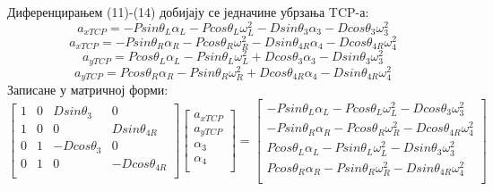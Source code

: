 \documentclass[12pt]{article}
\begin{document}
Диференцирањем (11)-(14) добијају се једначине убрзања TCP-а:
\begin{equation}
    a_{xTCP} = - Psin\theta_L\alpha_L - Pcos\theta_L\omega_L^2 - Dsin\theta_3\alpha_3 - Dcos\theta_3\omega_3^2
\end{equation}
\begin{equation}
    a_{xTCP} =  - Psin\theta_R\alpha_R - Pcos\theta_R\omega_R^2 - Dsin\theta_{4R}\alpha_4 - Dcos\theta_{4R}\omega_4^2
\end{equation}
\begin{equation}
    a_{yTCP} = Pcos\theta_L\alpha_L - Psin\theta_L\omega_L^2 + Dcos\theta_3\alpha_3 - Dsin\theta_3\omega_3^2 
\end{equation}
\begin{equation}
    a_{yTCP} = Pcos\theta_R\alpha_R - Psin\theta_R\omega_R^2 + Dcos\theta_{4R}\alpha_4 - Dsin\theta_{4R}\omega_4^2
\end{equation}
Записане у матричној форми:
\begin{equation}
\begin{bmatrix}
1 & 0 & Dsin\theta_3 & 0\\
1 & 0 & 0 & Dsin\theta_{4R}\\
0 & 1 & -Dcos\theta_3 & 0\\
0 & 1 & 0 & -Dcos\theta_{4R}\\
\end{bmatrix}
\begin{bmatrix}
a_{xTCP}\\
a_{yTCP}\\
\alpha_3\\
\alpha_4\\
\end{bmatrix}
=
\begin{bmatrix}
- Psin\theta_L\alpha_L - Pcos\theta_L\omega_L^2 - Dcos\theta_3\omega_3^2\\
- Psin\theta_R\alpha_R - Pcos\theta_R\omega_R^2 - Dcos\theta_{4R}\omega_4^2\\
Pcos\theta_L\alpha_L - Psin\theta_L\omega_L^2 - Dsin\theta_3\omega_3^2\\
Pcos\theta_R\alpha_R - Psin\theta_R\omega_R^2 - Dsin\theta_{4R}\omega_4^2\\
\end{bmatrix}
\end{equation}
\end{document}
